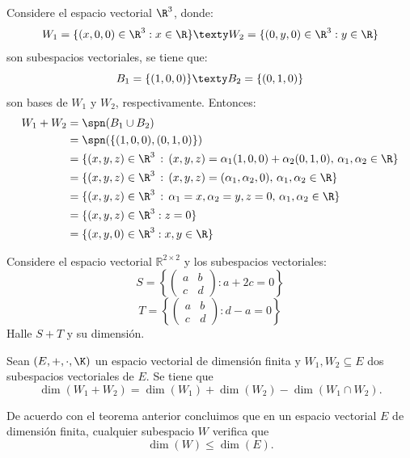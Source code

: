 \documentclass[compacto,10pt]{pubciencias-notas}
\begin{document}
\begin{ejem}\hspace{0pt} Considere el espacio vectorial $\R^{3}$, donde:
\[
    W_{1} = \{(x,0,0)\in \R^3: x \in \R \} 
    \texty
    W_{2} = \{(0,y,0)\in \R^3: y \in \R\}
\]
son subespacios vectoriales, se tiene que: 
\[
    B_{1} = \{(1, 0, 0)\}
    \texty
    B_{2} = \{(0, 1, 0)\}
\]
son bases de $W_{1}$ y $W_{2}$, respectivamente. Entonces:
\begin{align*}
    W_1+W_2
    &=\spn(B_{1} \cup B_{2})\\
    &= \spn(\{(1,0,0), (0,1,0)\})\\
    &= \{(x,y,z)\in\R^{3}\,:\, (x,y,z) = \alpha_{1}(1,0,0) + \alpha_{2}(0,1,0),\, \alpha_{1},\alpha_{2}\in\R \}\\
    &= \{(x,y,z)\in\R^{3}\,:\, (x,y,z) = (\alpha_{1},\alpha_{2},0),\, \alpha_{1},\alpha_{2}\in\R \}\\
    &= \{(x,y,z)\in\R^{3}\,:\, \alpha_{1} = x, \alpha_{2} = y, z=0,\, \alpha_{1},\alpha_{2}\in\R \}\\
    &= \{(x,y,z)\in \R^3:  z = 0\}\\
    &= \{(x,y,0)\in \R^3:  x,y\in \R \}
\end{align*}
\end{ejem}

\begin{ejer}\hspace{0pt} Considere el espacio vectorial $\mathbb{R}^{2\times 2}$ y los subespacios vectoriales:
\[S=\left\{\begin{pmatrix} a & b\\ c & d \end{pmatrix} : a+2c=0\right\}\]
\[T=\left\{\begin{pmatrix} a & b\\ c & d \end{pmatrix} : d-a=0\right\}\]
Halle $S+T$ y su dimensión.
\end{ejer}

\begin{teo}
    Sean $(E,+,\cdot,\K)$ un espacio vectorial de dimensión finita y $W_1,W_2\subseteq E$ dos subespacios vectoriales de $E$. Se tiene que
    \[
        \dim(W_1 + W_2) = \dim(W_1) + \dim(W_2) - \dim(W_1 \cap W_2).
    \]
\end{teo}

\begin{obs}
De acuerdo con el teorema anterior concluimos que en un espacio vectorial $E$ de dimensión finita, cualquier subespacio $W$ verifica que
\[
\dim(W) \leq \dim(E).
\]
\end{obs}
\end{document}
